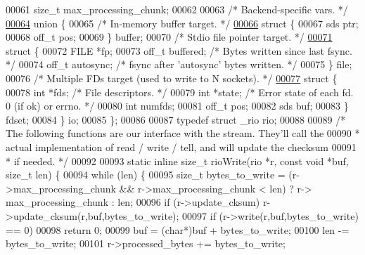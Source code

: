 \begin{DoxyCode}
00061     size\_t max\_processing\_chunk;
00062 
00063     \textcolor{comment}{/* Backend-specific vars. */}
\hyperlink{union__rio_8io}{00064}     \textcolor{keyword}{union} \{
00065         \textcolor{comment}{/* In-memory buffer target. */}
\hyperlink{struct__rio_8io_8buffer}{00066}         \textcolor{keyword}{struct} \{
00067             sds ptr;
00068             off\_t pos;
00069         \} buffer;
00070         \textcolor{comment}{/* Stdio file pointer target. */}
\hyperlink{struct__rio_8io_8file}{00071}         \textcolor{keyword}{struct} \{
00072             FILE *fp;
00073             off\_t buffered; \textcolor{comment}{/* Bytes written since last fsync. */}
00074             off\_t autosync; \textcolor{comment}{/* fsync after 'autosync' bytes written. */}
00075         \} file;
00076         \textcolor{comment}{/* Multiple FDs target (used to write to N sockets). */}
\hyperlink{struct__rio_8io_8fdset}{00077}         \textcolor{keyword}{struct} \{
00078             \textcolor{keywordtype}{int} *fds;       \textcolor{comment}{/* File descriptors. */}
00079             \textcolor{keywordtype}{int} *state;     \textcolor{comment}{/* Error state of each fd. 0 (if ok) or errno. */}
00080             \textcolor{keywordtype}{int} numfds;
00081             off\_t pos;
00082             sds buf;
00083         \} fdset;
00084     \} io;
00085 \};
00086 
00087 \textcolor{keyword}{typedef} \textcolor{keyword}{struct} \_rio rio;
00088 
00089 \textcolor{comment}{/* The following functions are our interface with the stream. They'll call the}
00090 \textcolor{comment}{ * actual implementation of read / write / tell, and will update the checksum}
00091 \textcolor{comment}{ * if needed. */}
00092 
00093 \textcolor{keyword}{static} \textcolor{keyword}{inline} size\_t rioWrite(rio *r, \textcolor{keyword}{const} \textcolor{keywordtype}{void} *buf, size\_t len) \{
00094     \textcolor{keywordflow}{while} (len) \{
00095         size\_t bytes\_to\_write = (r->max\_processing\_chunk && r->max\_processing\_chunk < len) ? r->
      max\_processing\_chunk : len;
00096         \textcolor{keywordflow}{if} (r->update\_cksum) r->update\_cksum(r,buf,bytes\_to\_write);
00097         \textcolor{keywordflow}{if} (r->write(r,buf,bytes\_to\_write) == 0)
00098             \textcolor{keywordflow}{return} 0;
00099         buf = (\textcolor{keywordtype}{char}*)buf + bytes\_to\_write;
00100         len -= bytes\_to\_write;
00101         r->processed\_bytes += bytes\_to\_write;

\end{DoxyCode}
